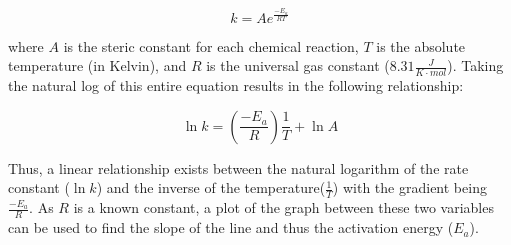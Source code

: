 \[k = Ae^{\frac{-E_a}{RT}}\]

where $A$ is the steric constant for each chemical reaction, $T$ is the absolute temperature (in Kelvin), and $R$ is the universal gas constant ($8.31 \frac{J}{K \cdot mol}$). Taking the natural log of this entire equation results in the following relationship:

\[\ln{k} = \left(\frac{-E_a}{R}\right)\frac{1}{T} + \ln{A}\]

Thus, a linear relationship exists between the natural logarithm of the rate constant ($\ln{k}$) and the inverse of the temperature($\frac{1}{T}$) with the gradient being $\frac{-E_a}{R}$. As $R$ is a known constant, a plot of the graph between these two variables can be used to find the slope of the line and thus the activation energy ($E_a$).